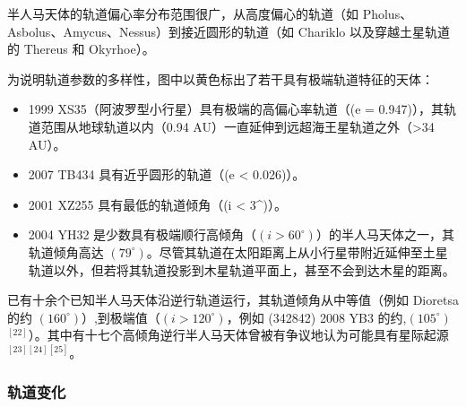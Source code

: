半人马天体的轨道偏心率分布范围很广，从高度偏心的轨道（如 Pholus、Asbolus、Amycus、Nessus）到接近圆形的轨道（如 Chariklo 以及穿越土星轨道的 Thereus 和 Okyrhoe）。

为说明轨道参数的多样性，图中以黄色标出了若干具有极端轨道特征的天体：
\begin{itemize}
\item 1999 XS35（阿波罗型小行星）具有极端的高偏心率轨道（(e = 0.947)），其轨道范围从地球轨道以内（0.94 AU）一直延伸到远超海王星轨道之外（>34 AU）。
\item 2007 TB434 具有近乎圆形的轨道（(e < 0.026)）。
\item 2001 XZ255 具有最低的轨道倾角（(i < 3^\circ)）。
\item 2004 YH32 是少数具有极端顺行高倾角（$(i > 60^\circ)$）的半人马天体之一，其轨道倾角高达 $(79^\circ)$。尽管其轨道在太阳距离上从小行星带附近延伸至土星轨道以外，但若将其轨道投影到木星轨道平面上，甚至不会到达木星的距离。
\end{itemize}
已有十余个已知半人马天体沿逆行轨道运行，其轨道倾角从中等值（例如 Dioretsa 的约 $(160^\circ)$）,到极端值（$(i>120^\circ)$，例如 (342842) 2008 YB3 的约,$(105^\circ)$ $^{[22]}$）。其中有十七个高倾角逆行半人马天体曾被有争议地认为可能具有星际起源 $^{[23][24][25]}$。
\subsubsection{轨道变化}
